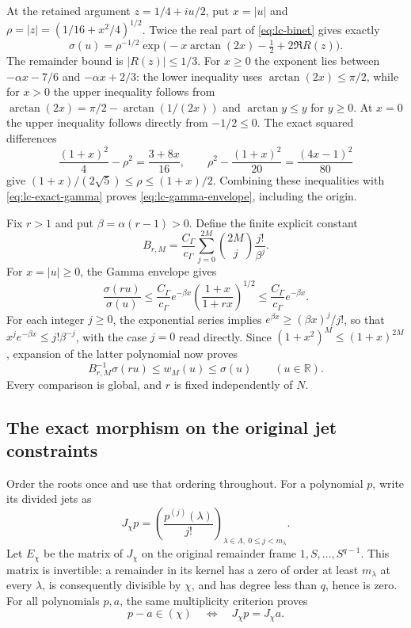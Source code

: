 At the retained argument $z=1/4+iu/2$, put
$x=|u|$ and $\rho=|z|=(1/16+x^2/4)^{1/2}$. Twice the real part of
\eqref{eq:lc-binet} gives exactly
\[
 \sigma(u)=\rho^{-1/2}
 \exp\bigl(-x\arctan(2x)-\tfrac12+2\Re R(z)\bigr).
 \tag{LC.6}\label{eq:lc-exact-gamma}
\]
The remainder bound is $|R(z)|\le1/3$. For $x\ge0$ the exponent lies
between $-\alpha x-7/6$ and $-\alpha x+2/3$: the lower inequality uses
$\arctan(2x)\le\pi/2$, while for $x>0$ the upper inequality follows from
$\arctan(2x)=\pi/2-\arctan(1/(2x))$ and
$\arctan y\le y$ for $y\ge0$. At $x=0$ the upper inequality follows
directly from $-1/2\le0$. The exact squared differences
\[
 \frac{(1+x)^2}{4}-\rho^2=\frac{3+8x}{16},
 \qquad
 \rho^2-\frac{(1+x)^2}{20}=\frac{(4x-1)^2}{80}
\]
give $(1+x)/(2\sqrt5)\le\rho\le(1+x)/2$. Combining these inequalities
with \eqref{eq:lc-exact-gamma} proves \eqref{eq:lc-gamma-envelope}, including
the origin.

Fix $r>1$ and put $\beta=\alpha(r-1)>0$. Define the finite explicit constant
\[
 B_{r,M}=\frac{C_\Gamma}{c_\Gamma}
 \sum_{j=0}^{2M}\binom{2M}{j}\frac{j!}{\beta^j}.
 \tag{LC.7}\label{eq:lc-constant}
\]
For $x=|u|\ge0$, the Gamma envelope gives
\[
 \frac{\sigma(ru)}{\sigma(u)}
 \le\frac{C_\Gamma}{c_\Gamma}e^{-\beta x}
 \left(\frac{1+x}{1+rx}\right)^{1/2}
 \le\frac{C_\Gamma}{c_\Gamma}e^{-\beta x}.
\]
For each integer $j\ge0$, the exponential series implies
$e^{\beta x}\ge(\beta x)^j/j!$, so that
$x^je^{-\beta x}\le j!\beta^{-j}$, with the case $j=0$ read directly.
Since $(1+x^2)^M\le(1+x)^{2M}$, expansion of the latter polynomial now proves
\[
 B_{r,M}^{-1}\sigma(ru)\le w_M(u)\le\sigma(u)
 \qquad(u\in\mathbb R).
 \tag{LC.8}\label{eq:lc-pointwise-sandwich}
\]
Every comparison is global, and $r$ is fixed independently of $N$.

\subsection{The exact morphism on the original jet constraints}

Order the roots once and use that ordering throughout. For a polynomial $p$,
write its divided jets as
\[
 J_\chi p=\left(\frac{p^{(j)}(\lambda)}{j!}\right)_
 {\lambda\in\Lambda,\ 0\le j<m_\lambda}.
\]
Let $E_\chi$ be the matrix of $J_\chi$ on the original remainder frame
$1,S,\ldots,S^{q-1}$. This matrix is invertible: a remainder in its kernel
has a zero of order at least $m_\lambda$ at every $\lambda$, is consequently
divisible by $\chi$, and has degree less than $q$, hence is zero.
For all polynomials $p,a$, the same multiplicity criterion proves
\[
 p-a\in(\chi)\quad\Longleftrightarrow\quad J_\chi p=J_\chi a.
 \tag{LC.9}\label{eq:lc-exact-constraints}
\]

